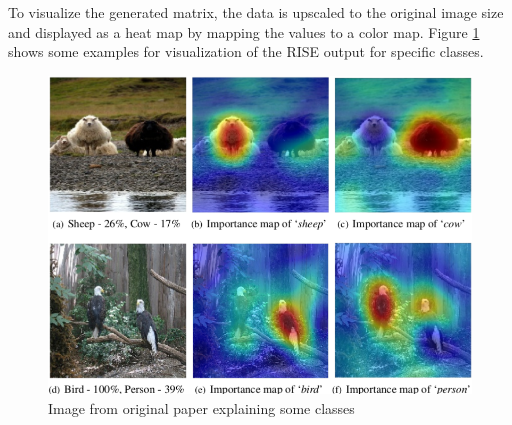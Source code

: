 To visualize the generated matrix, the data is upscaled to the original image size and displayed as a heat map by mapping the values to a color map. Figure \ref{rise_example} shows some examples for visualization of the RISE output for specific classes.

\begin{figure}[H]
\centering
\includegraphics[width=12cm]{chapters/02_methods/images/rise/sheep.png}
\caption{Image from original paper explaining some classes}
\label{rise_example}
\end{figure}
